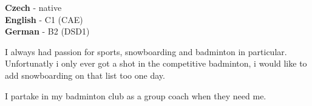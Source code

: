 \documentclass[9pt]{developercv} %
\begin{document}
\begin{minipage}[t]{0.3\textwidth}
	\vspace{-\baselineskip} %

	
	\textbf{Czech} - native\\
	\textbf{English} - C1 (CAE)\\
	\textbf{German} - B2 (DSD1)
\end{minipage}
\hfill
\begin{minipage}[t]{0.3\textwidth}
	\vspace{-\baselineskip} %
	
	
	I always had passion for sports, snowboarding and badminton in particular. Unfortunatly i only ever got a shot in the competitive badminton, i would like to add snowboarding on that list too one day.
\end{minipage}
\hfill
\begin{minipage}[t]{0.3\textwidth}
	\vspace{-\baselineskip} %
	
	
	I partake in my badminton club as a group coach when they need me.
\end{minipage}

\end{document}
